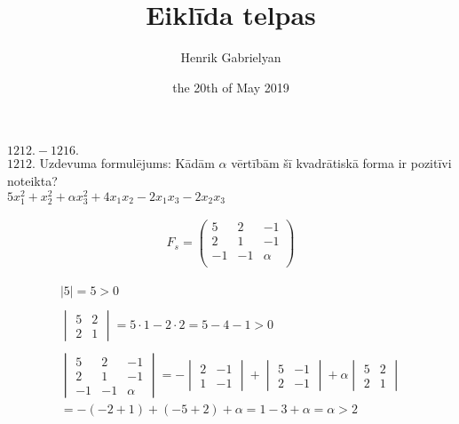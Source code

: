 \documentclass[12pt]{article}
\title{Eiklīda telpas}
\author{Henrik Gabrielyan}
\date{the 20th of May 2019}
\begin{document}
\maketitle

\theoremstyle{definition}
\newtheorem*{definition}{Def}
\newtheorem*{theorem}{Teo}[section]
\renewcommand\qedsymbol{$\blacksquare$}
\renewcommand*{\proofname}{Pier}

\section*{}
\underline{$1212. - 1216.$}\\

$1212.$  Uzdevuma formulējums: 
Kādām $\alpha$ vērtībām šī kvadrātiskā forma ir pozitīvi noteikta? \\

$ 5x_1^2 + x_2^2 +  \alpha x_3^2 + 4x_1x_2-2x_1x_3-2x_2x_3$

\begin{gather*}
F_s = 
\begin{pmatrix}
   5 & 2 & -1 \\
   2 & 1 & -1 \\
   -1 & -1 & \alpha \\
\end{pmatrix}
\end {gather*}

\begin{gather*}
	|5| = 5 > 0 \quad \quad \\ \\
	\begin{vmatrix} 
		5 & 2 \\
		2 & 1 
	\end{vmatrix}
 	= 5 \cdot 1 - 2 \cdot 2  = 5 - 4 - 1 > 0 \\ \\
 	\begin{vmatrix} 
		5 & 2 & -1 \\
		2 & 1 & -1 \\
		-1 & -1 & \alpha
	\end{vmatrix}
	= -
	\begin{vmatrix}
	2 & -1 \\
	1 & -1
	\end{vmatrix}
	+
	\begin{vmatrix}
	5 & -1 \\
	2 & -1  
	\end{vmatrix}
	+ \alpha
	\begin{vmatrix}
	5 & 2 \\
	2 & 1 
	\end{vmatrix} \\ 
	= -(-2 + 1) + (-5 + 2) + \alpha = 1 - 3 + \alpha = \alpha  > 2 
\end{gather*}
\pagebreak
\end{document}
